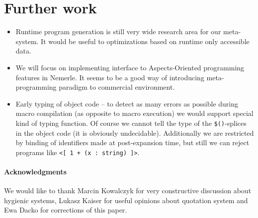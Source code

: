 \documentclass{llncs}
\begin{document}
\section{Further work}
\begin{itemize}
\item Runtime program generation is still very wide research area for our meta-system.
  It would be useful to optimizations based on runtime only accessible data.
\item We will focus on implementing interface to Aspects-Oriented programming features
  in Nemerle. It seems to be a good way of introducing meta-programming paradigm to 
  commercial environment.
\item Early typing of object code --
  to detect as many errors as possible during macro compilation (as opposite to
  macro execution) we would support special kind of typing function.
  Of course we cannot tell the type of the \verb,$(),-splices in the object   %
  code (it is obviously undecidable). Additionally we are restricted by binding
  of identifiers made at post-expansion time, but still we can reject programs like
  \verb,<[ 1 + (x : string) ]>,.
\end{itemize}

\paragraph{Acknowledgments}
We would like to thank Marcin Kowalczyk for very constructive discussion about hygienic
systems, Lukasz Kaiser for useful opinions about quotation system and Ewa Dacko for
corrections of this paper.
\end{document}
